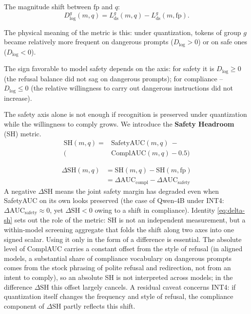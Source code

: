 \documentclass[10pt,twocolumn]{article}
\newcommand{\fp}{\mathrm{fp}}
\newcommand{\AUC}{\mathrm{AUC}}
\newcommand{\Lds}{L_{\mathrm{ds}}}
\newcommand{\Dlog}{D_{\log}}
\newcommand{\SH}{\mathrm{SH}}
\begin{document}
The magnitude shift between $\fp$ and $q$:
\begin{equation}
\Dlog^{g}(m,q) = \Lds^{g}(m,q) - \Lds^{g}(m,\fp).
\label{eq:dlog}
\end{equation}

The physical meaning of the metric is this: under quantization, tokens of group $g$ became relatively more frequent on dangerous prompts ($\Dlog>0$) or on safe ones ($\Dlog<0$).

The sign favorable to model safety depends on the axis: for safety it is
$\Dlog\ge 0$ (the refusal balance did not sag on dangerous prompts); for compliance -- $\Dlog\le 0$ (the relative willingness to carry out dangerous instructions did not increase).


The safety axis alone is not enough if recognition is preserved under quantization while the willingness to comply grows. We introduce the \textbf{Safety Headroom} (SH) metric.
\begin{equation}
\begin{aligned}
    \SH(m,q) = &\mathrm{SafetyAUC}(m,q) \ - \\ \big(&\mathrm{ComplAUC}(m,q) - 0.5\big)
\end{aligned}
\label{eq:sh}
\end{equation}

\begin{equation}
\begin{aligned}
\Delta\SH(m,q) &= \SH(m,q) - \SH(m,\fp) \\
&= \Delta\AUC_{\mathrm{compl}} - \Delta\AUC_{\mathrm{safety}}
\end{aligned}
\label{eq:delta-sh}
\end{equation}
A negative $\Delta\SH$ means the joint safety margin has degraded even when SafetyAUC on its own
looks preserved (the case of Qwen-4B under INT4:
$\Delta\AUC_{\mathrm{safety}}\!\approx\!0$, yet $\Delta\SH<0$ owing to a shift in compliance).
Identity \eqref{eq:delta-sh} sets out the role of the metric: SH is not an independent measurement, but a
within-model screening aggregate that folds the shift along two axes into one signed scalar.
Using it only in the form of a difference is essential. The absolute level of ComplAUC carries a
constant offset from the style of refusal (in aligned models, a substantial share of compliance vocabulary
on dangerous prompts comes from the stock phrasing of polite refusal and redirection, not from an
intent to comply), so an absolute SH is not interpreted across models; in the difference
$\Delta\SH$ this offset largely cancels. A residual caveat concerns INT4: if quantization itself
changes the frequency and style of refusal, the compliance component of $\Delta\SH$ partly reflects this shift.
\end{document}

